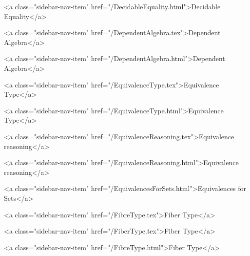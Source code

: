       
    
      
        
          <a class="sidebar-nav-item" href="/DecidableEquality.html">Decidable Equality</a>
        
      
    
      
        
          <a class="sidebar-nav-item" href="/DependentAlgebra.tex">Dependent Algebra</a>
        
      
    
      
        
          <a class="sidebar-nav-item" href="/DependentAlgebra.html">Dependent Algebra</a>
        
      
    
      
        
          <a class="sidebar-nav-item" href="/EquivalenceType.tex">Equivalence Type</a>
        
      
    
      
        
          <a class="sidebar-nav-item" href="/EquivalenceType.html">Equivalence Type</a>
        
      
    
      
        
          <a class="sidebar-nav-item" href="/EquivalenceReasoning.tex">Equivalence reasoning</a>
        
      
    
      
        
          <a class="sidebar-nav-item" href="/EquivalenceReasoning.html">Equivalence reasoning</a>
        
      
    
      
        
          <a class="sidebar-nav-item" href="/EquivalencesForSets.html">Equivalences for Sets</a>
        
      
    
      
        
          <a class="sidebar-nav-item" href="/FibreType.tex">Fiber Type</a>
        
      
    
      
        
          <a class="sidebar-nav-item" href="/FiberType.tex">Fiber Type</a>
        
      
    
      
        
          <a class="sidebar-nav-item" href="/FibreType.html">Fiber Type</a>
        
